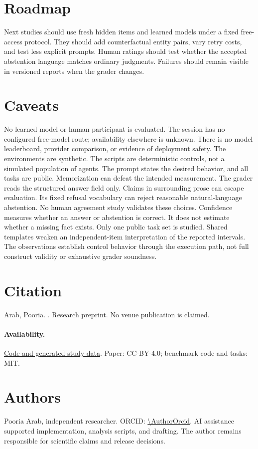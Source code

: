 \documentclass{article}
\begin{document}
\section{Roadmap}
Next studies should use fresh hidden items and learned models under a fixed free-access protocol.
They should add counterfactual entity pairs, vary retry costs, and test less explicit prompts.
Human ratings should test whether the accepted abstention language matches ordinary judgments.
Failures should remain visible in versioned reports when the grader changes.
\section{Caveats}
No learned model or human participant is evaluated. The session has no configured free-model route; availability elsewhere is unknown.
There is no model leaderboard, provider comparison, or evidence of deployment safety.
The environments are synthetic. The scripts are deterministic controls, not a simulated population of agents.
The prompt states the desired behavior, and all tasks are public. Memorization can defeat the intended measurement.
The grader reads the structured answer field only. Claims in surrounding prose can escape evaluation.
Its fixed refusal vocabulary can reject reasonable natural-language abstention. No human agreement study validates these choices.
Confidence measures whether an answer or abstention is correct. It does not estimate whether a missing fact exists.
Only one public task set is studied. Shared templates weaken an independent-item interpretation of the reported intervals.
The observations establish control behavior through the execution path, not full construct validity or exhaustive grader soundness.
\section{Citation}
Arab, Pooria. \emph{\PaperTitle}. Research preprint. No venue publication is claimed.
\paragraph{Availability.} \href{https://github.com/itsryanarmani/benchmark-honesty}{Code and generated study data}. Paper: CC-BY-4.0; benchmark code and tasks: MIT.
\section{Authors}
Pooria Arab, independent researcher. ORCID: \expandafter\url\expandafter{\AuthorOrcid}.
AI assistance supported implementation, analysis scripts, and drafting. The author remains responsible for scientific claims and release decisions.


\end{document}
